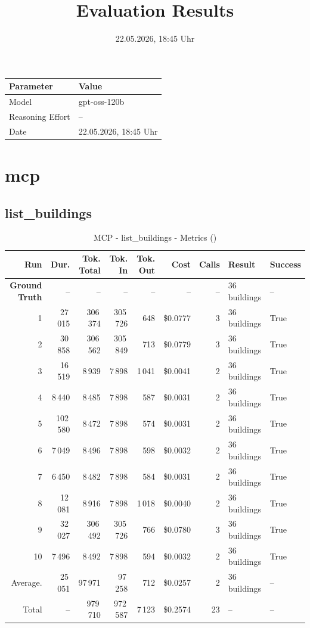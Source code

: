 \documentclass[a4paper,11pt]{article}
\title{Evaluation Results}
\date{22.05.2026, 18:45 Uhr}
\begin{document}
\maketitle

\begin{table}[H]
\centering
\begin{tabular}{l l}
\toprule
\textbf{Parameter} & \textbf{Value} \\
\midrule
Model & gpt-oss-120b \\
Reasoning Effort & -- \\
Date & 22.05.2026, 18:45 Uhr \\
\bottomrule
\end{tabular}
\end{table}

\tableofcontents
\clearpage

\section{mcp}

\subsection{list\_buildings}

\begin{table}[ht]
\centering
\scriptsize
\caption{MCP - list\_buildings - Metrics ()}
\label{tab:mcp\_list\_buildings\_metrics\_}
\begin{tabular}{r r r r r r r p{3cm} l}
\hline
Run & Dur. & Tok. Total & Tok. In & Tok. Out & Cost & Calls & Result & Success \\
\hline
\textbf{Ground Truth} & -- & -- & -- & -- & -- & -- & 36 buildings & -- \\
\hline
1 & 27\,015 & 306\,374 & 305\,726 & 648 & \$0.0777 & 3 & 36 buildings & True \\
2 & 30\,858 & 306\,562 & 305\,849 & 713 & \$0.0779 & 3 & 36 buildings & True \\
3 & 16\,519 & 8\,939 & 7\,898 & 1\,041 & \$0.0041 & 2 & 36 buildings & True \\
4 & 8\,440 & 8\,485 & 7\,898 & 587 & \$0.0031 & 2 & 36 buildings & True \\
5 & 102\,580 & 8\,472 & 7\,898 & 574 & \$0.0031 & 2 & 36 buildings & True \\
6 & 7\,049 & 8\,496 & 7\,898 & 598 & \$0.0032 & 2 & 36 buildings & True \\
7 & 6\,450 & 8\,482 & 7\,898 & 584 & \$0.0031 & 2 & 36 buildings & True \\
8 & 12\,081 & 8\,916 & 7\,898 & 1\,018 & \$0.0040 & 2 & 36 buildings & True \\
9 & 32\,027 & 306\,492 & 305\,726 & 766 & \$0.0780 & 3 & 36 buildings & True \\
10 & 7\,496 & 8\,492 & 7\,898 & 594 & \$0.0032 & 2 & 36 buildings & True \\
\hline
Average. & 25\,051 & 97\,971 & 97\,258 & 712 & \$0.0257 & 2 & 36 buildings & -- \\
Total & -- & 979\,710 & 972\,587 & 7\,123 & \$0.2574 & 23 & -- & -- \\
\hline
\end{tabular}
\end{table}
\end{document}
